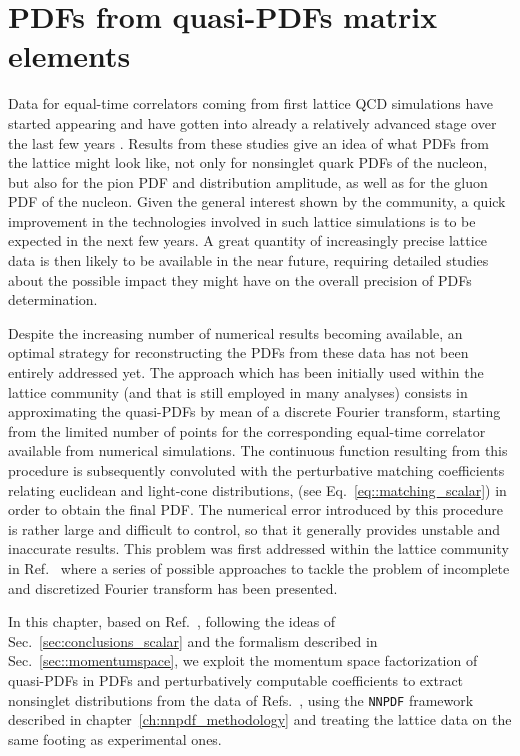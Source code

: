 \chapter{PDFs from quasi-PDFs matrix elements}
\label{ch:qpdfNNPDF}
Data for equal-time correlators coming from first lattice QCD simulations
have started appearing and have gotten into already a relatively advanced stage over the last few years
\cite{Lin:2014zya,Alexandrou:2015rja,Chen:2016utp,Alexandrou:2016jqi,Zhang:2017bzy,Alexandrou:2017huk,Lin:2017ani,Chen:2017gck,Alexandrou:2018pbm,Chen:2018xof,Chen:2018fwa,Alexandrou:2018eet,Liu:2018uuj,Lin:2018qky,Fan:2018dxu,Liu:2018hxv,Alexandrou:2019lfo,Izubuchi:2019lyk}.
Results from these studies give an idea of what PDFs from the lattice might look like, not only for
nonsinglet quark PDFs of the nucleon, but also for the pion PDF and distribution
amplitude, as well as for the gluon PDF of the nucleon. Given the general
interest shown by the community, a quick improvement in the technologies
involved in such lattice simulations is to be expected in the next few years. A
great quantity of increasingly precise lattice data is then likely to be
available in the near future, requiring detailed studies about the possible
impact they might have on the overall precision of PDFs determination.

Despite the increasing number of numerical results becoming available, an
optimal strategy for reconstructing the PDFs from these data has not been
entirely addressed yet. The approach which has been initially used within the lattice community
(and that is still employed in many analyses)
consists in approximating the quasi-PDFs by mean of a discrete Fourier transform,
starting from the limited number of points for the corresponding equal-time correlator available from numerical simulations. 
The continuous function resulting from this procedure
is subsequently convoluted with the perturbative matching coefficients relating euclidean and light-cone distributions,
(see Eq.~\eqref{eq::matching_scalar}) in order to obtain the final PDF.
The numerical error introduced by this procedure is rather large and difficult to control,
so that it generally provides unstable and inaccurate results.
This problem was first addressed within the lattice community in Ref.~\cite{Karpie2019}
where a series of possible approaches to tackle the problem of incomplete and discretized Fourier
transform has been presented.

In this chapter, based on Ref.~\cite{Cichy:2019ebf}, following the ideas of Sec.~\ref{sec:conclusions_scalar}
and the formalism described in Sec.~\ref{sec::momentumspace}, we exploit the momentum space factorization
of quasi-PDFs in PDFs and perturbatively computable coefficients to extract nonsinglet distributions from the data of
Refs.~\cite{Alexandrou:2018pbm,Alexandrou:2019lfo}, using the {\tt NNPDF} framework described
in chapter~\ref{ch:nnpdf_methodology} and treating the lattice data on the same footing as experimental ones.

